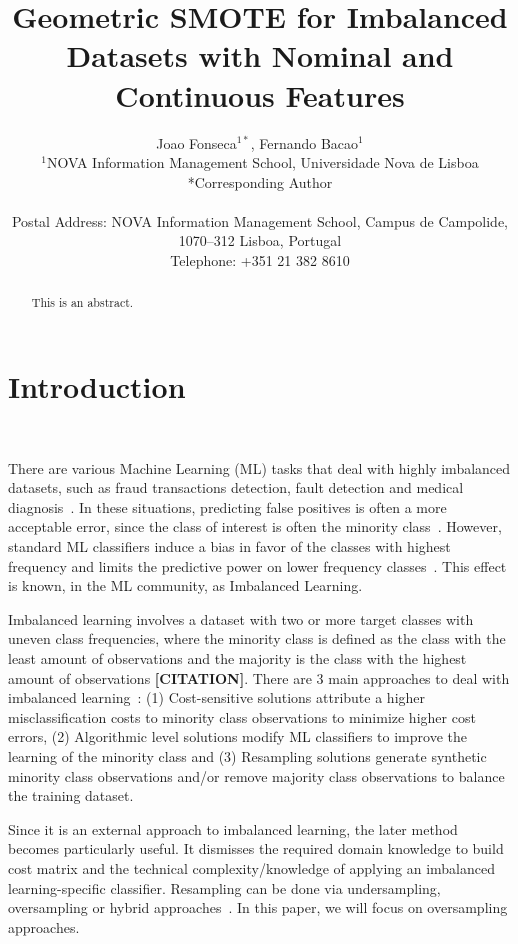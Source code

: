 \documentclass[parskip=full]{scrartcl}
\title{Geometric SMOTE for Imbalanced Datasets with Nominal and Continuous Features}
\author{%
	Joao Fonseca\(^{1*}\), Fernando Bacao\(^{1}\)
	\\
	\small{\(^{1}\)NOVA Information Management School, Universidade Nova de Lisboa}
	\\
	\small{*Corresponding Author}
	\\
	\\
	\small{Postal Address: NOVA Information Management School, Campus de
    Campolide, 1070--312 Lisboa, Portugal}
	\\
	\small{Telephone: +351 21 382 8610}
}
\date{}
\begin{document}
\maketitle

\begin{abstract}
    This is an abstract.
\end{abstract}

\section{Introduction}~\label{sec:introduction}

There are various Machine Learning (ML) tasks that deal with highly imbalanced
datasets, such as fraud transactions detection, fault detection and medical
diagnosis~\cite{tyagi2020sampling}. In these situations, predicting false
positives is often a more acceptable error, since the class of interest is
often the minority class~\cite{vuttipittayamongkol2021class}. However,
standard ML classifiers induce a bias in favor of the classes with highest
frequency and limits the predictive power on lower frequency
classes~\cite{lopez2013insight, das2018handling}. This effect is known, in the
ML community, as Imbalanced Learning. 

Imbalanced learning involves a dataset with two or more target classes with
uneven class frequencies, where the minority class is defined as the class
with the least amount of observations and the majority is the class with the
highest amount of observations \textbf{[CITATION]}. There are 3 main
approaches to deal with imbalanced learning~\cite{fernandez2013analysing}: (1)
Cost-sensitive solutions attribute a higher misclassification costs to
minority class observations to minimize higher cost errors, (2) Algorithmic
level solutions modify ML classifiers to improve the learning of the minority
class and (3) Resampling solutions generate synthetic minority class
observations and/or remove majority class observations to balance the training
dataset.

Since it is an external approach to imbalanced learning, the later method
becomes particularly useful. It dismisses the required domain knowledge to
build cost matrix and the technical complexity/knowledge of applying an
imbalanced learning-specific classifier. Resampling can be done via
undersampling, oversampling or hybrid approaches~\cite{tarekegn2021review}. In
this paper, we will focus on oversampling approaches.
\end{document}
